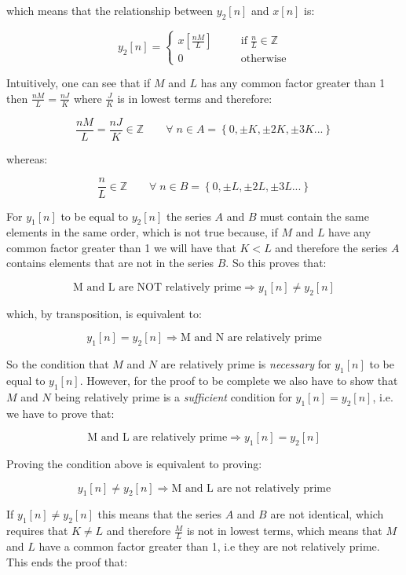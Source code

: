 \documentclass[a4paper,11pt,oneside]{article}
\begin{document}
which means that the relationship between $y_2[n]$ and $x[n]$ is:

\[
y_2[n]=\left\{
\begin{array}{lll}
x[\frac{nM}{L}] & \quad& \textrm{if}\; \frac{n}{L} \in \mathbb{Z}\\
0 &\quad& \textrm{otherwise}
\end{array}
\right.
\]


Intuitively, one can see that if $M$ and $L$ has any common factor greater than 1 then $\frac{nM}{L}=\frac{nJ}{K}$ where $\frac{J}{K}$ is in lowest terms and therefore:

\[
\frac{nM}{L}=\frac{nJ}{K}\in\mathbb{Z} \qquad \forall \; n\in A=\left\{0,\pm K,\pm 2K,\pm 3K...\right\}
\]

whereas:

\[
\frac{n}{L}\in\mathbb{Z} \qquad \forall \; n\in B=\left\{0,\pm L,\pm 2L,\pm 3L...\right\}
\]


For $y_1[n]$ to be equal to $y_2[n]$ the series $A$ and $B$ must contain the same elements in the same order, which is not true because, if $M$ and $L$ have any common factor greater than 1 we will have that $K<L$ and therefore the series $A$ contains elements that are not in the series $B$. So this proves that:

\[
\textrm{M and L are NOT relatively prime} \Rightarrow y_1[n]\neq y_{2}[n]
\]

which, by transposition, is equivalent to:

\[
y_1[n]=y_2[n] \Rightarrow \textrm{M and N are relatively prime}
\]

So the condition that $M$ and $N$ are relatively prime is \emph{necessary} for $y_1[n]$ to be equal to $y_1[n]$. However, for the proof to be complete we also have to show that $M$ and $N$ being relatively prime is a \emph{sufficient} condition for $y_1[n]=y_2[n]$, i.e. we have to prove that:

\[
\textrm{M and L are relatively prime}  \Rightarrow  y_1[n]=y_2[n]
\]

Proving the condition above is equivalent to proving:

\[
y_1[n]\neq y_2[n] \Rightarrow \textrm{M and L are not relatively prime}
\]

If $y_1[n]\neq y_2[n]$ this means that the series $A$ and $B$ are not identical, which requires that $K\neq L$ and therefore $\frac{M}{L}$ is not in lowest terms, which means that $M$ and $L$ have a common factor greater than 1, i.e they are not relatively prime. This ends the proof that:
\end{document}
